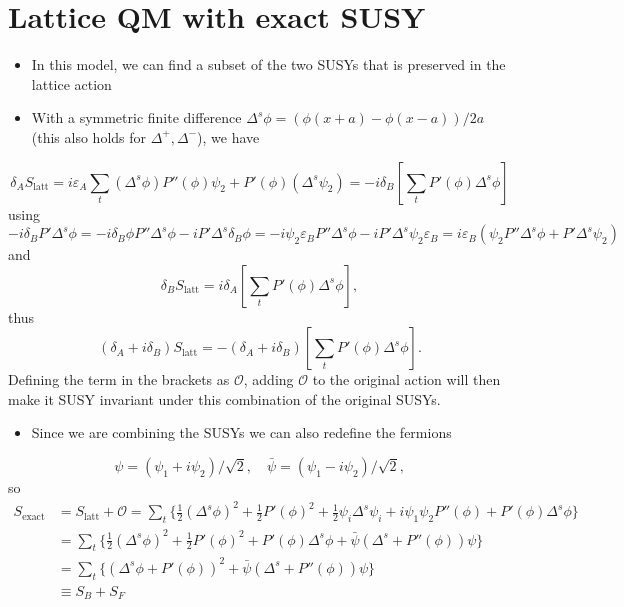 \section{Lattice QM with exact SUSY}
\begin{itemize}
    \item In this model, we can find a subset of the two SUSYs that is preserved in the lattice action
    \item With a symmetric finite difference $\Delta^s\phi = (\phi(x+a) - \phi(x-a))/2a$ (this also holds for $\Delta^+, \Delta^-$), we have
\end{itemize}
\begin{equation}
    \delta_A S_\text{latt} = i \varepsilon_A \sum_t(\Delta^s\phi)P''(\phi)\psi_2 + P'(\phi) (\Delta^s\psi_2) = - i \delta_B[\sum_t P'(\phi) \Delta^s\phi]
\end{equation}
using
\begin{equation}
    -i\delta_BP'\Delta^s\phi=-i\delta_B\phi P''\Delta^s\phi - i P'\Delta^s\delta_B\phi = 
    -i\psi_2\varepsilon_BP''\Delta^s\phi-iP'\Delta^s\psi_2\varepsilon_B=
    i\varepsilon_B(\psi_2P''\Delta^s\phi+P'\Delta^s\psi_2)
\end{equation}
and
\begin{equation}
    \delta_B S_\text{latt} = i \delta_A[\sum_t P'(\phi) \Delta^s\phi],
\end{equation}
thus
\begin{equation}
    (\delta_A + i \delta_B)S_\text{latt} = -(\delta_A + i \delta_B)[\sum_t P'(\phi) \Delta^s\phi].
\end{equation}
Defining the term in the brackets as $\mathcal{O}$, adding $\mathcal{O}$ to the original action will then make it SUSY invariant under this combination of the original SUSYs.
\begin{itemize}
    \item Since we are combining the SUSYs we can also redefine the fermions
\end{itemize}
\begin{equation}
    \psi = (\psi_1 + i \psi_2)/\sqrt{2}, \quad \bar{\psi} = (\psi_1 - i \psi_2) /\sqrt{2},
\end{equation}
so
\begin{align}
    S_\text{exact} &= S_\text{latt} + \mathcal{O} = \sum_t \{ \frac{1}{2}(\Delta^s \phi)^2 + \frac{1}{2} P'(\phi)^2 + \frac{1}{2}\psi_i \Delta^s \psi_i + i \psi_1 \psi_2 P''(\phi) + P'(\phi) \Delta^s \phi\} \nonumber \\
    &= \sum_t \{\frac{1}{2}(\Delta^s \phi)^2 + \frac{1}{2}P'(\phi)^2 + P'(\phi) \Delta^s \phi + \bar{\psi}(\Delta^s + P''(\phi))\psi \} \nonumber \\
    &= \sum_t \{(\Delta^s \phi + P'(\phi))^2 + \bar{\psi}(\Delta^s + P''(\phi))\psi \} \nonumber \\
    &\equiv S_B + S_F
\end{align}
